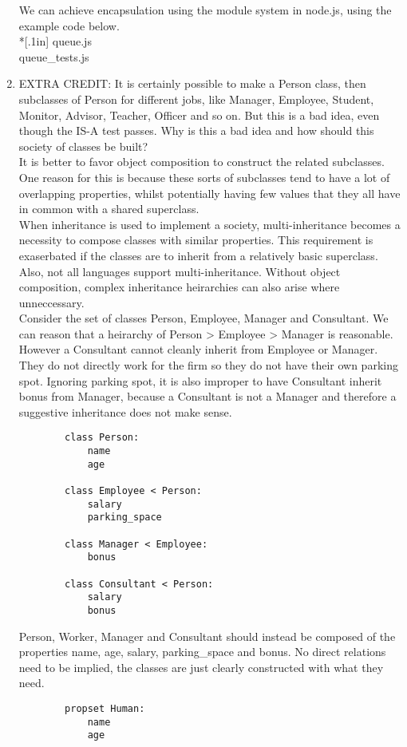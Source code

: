 \documentclass{article}
\begin{document}
\begin{enumerate}
    We can achieve encapsulation using the module system in node.js, using the example code below. \\*[.1in]
    queue.js \\
    
    queue\_tests.js \\
    
    \pagebreak
    \item EXTRA CREDIT: It is certainly possible to make a Person class, then subclasses of Person for different jobs, like Manager, Employee, Student, Monitor, Advisor, Teacher, Officer and so on. But this is a bad idea, even though the IS-A test passes. Why is this a bad idea and how should this society of classes be built? \\[.1in]

    It is better to favor object composition to construct the related subclasses. One reason for this is because these sorts of subclasses tend to have a lot of overlapping properties, whilst potentially having few values that they all have in common with a shared superclass. \\[.1in]
    When inheritance is used to implement a society, multi-inheritance becomes a necessity to compose classes with similar properties. This requirement is exaserbated if the classes are to inherit from a relatively basic superclass. Also, not all languages support multi-inheritance. Without object composition, complex inheritance heirarchies can also arise where unneccessary. \\[.1in]
    Consider the set of classes Person, Employee, Manager and Consultant. We can reason that a heirarchy of Person > Employee > Manager is reasonable. However a Consultant cannot cleanly inherit from Employee or Manager. They do not directly work for the firm so they do not have their own parking spot. Ignoring parking spot, it is also improper to have Consultant inherit bonus from Manager, because a Consultant is not a Manager and therefore a suggestive inheritance does not make sense. \\[.1in]
    \begin{verbatim}
        class Person:
            name
            age

        class Employee < Person:
            salary
            parking_space

        class Manager < Employee:
            bonus

        class Consultant < Person:
            salary
            bonus
    \end{verbatim}
    \pagebreak
    Person, Worker, Manager and Consultant should instead be composed of the properties name, age, salary, parking\_space and bonus. No direct relations need to be implied, the classes are just clearly constructed with what they need.
    \begin{verbatim}
        propset Human:
            name
            age


\end{verbatim}
\end{enumerate}
\end{document}
